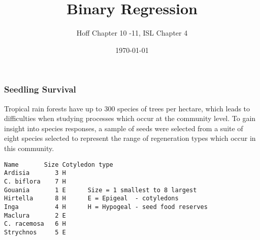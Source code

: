 \documentclass[]{beamer}
\title{Binary Regression}
\author{Hoff Chapter 10 -11, ISL Chapter 4 }
\date{\today}
\begin{document}
\maketitle
\begin{frame}[fragile]\frametitle{Seedling Survival}
  
  Tropical rain forests have up to 300 species of trees per hectare,
  which leads to difficulties when studying processes which occur at
  the community level. To gain insight into species responses, a
  sample of seeds were selected from a suite of eight species selected
  to represent the range of regeneration types which occur in this
  community.
\begin{verbatim}
Name       Size Cotyledon type
Ardisia       3 H     
C. biflora    7 H     
Gouania       1 E      Size = 1 smallest to 8 largest
Hirtella      8 H      E = Epigeal  - cotyledons
Inga          4 H      H = Hypogeal - seed food reserves  
Maclura       2 E
C. racemosa   6 H
Strychnos     5 E
\end{verbatim}
\end{frame}
\end{document}
